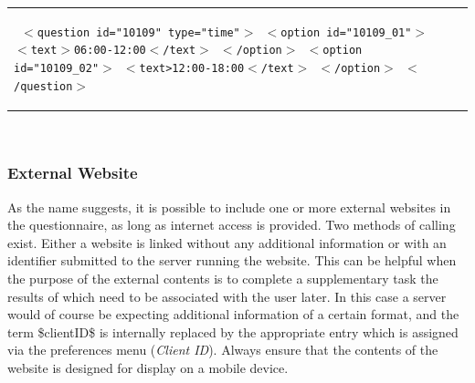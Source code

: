 \documentclass[11pt,a4paper,titlepage]{article}
\begin{document}
\begin{center}
\hspace{-0.8cm}
\begin{tabular}{p{} p{}} 
		\begin{tcolorbox}[colback=black!10!white,colframe=black!50!white, boxsep=1pt,left=4pt,right=4pt,top=4pt,bottom=2pt]
		\texttt{\noindent
			$<$question id="10109" type="time"$>$\newline
			\hspace*{0.5cm}$<$option id="10109\_01"$>$\newline
			\hspace*{1.0cm}$<$text$>$06:00-12:00$<$/text$>$\newline
			\hspace*{0.5cm}$<$/option$>$\newline
			\hspace*{0.5cm}$<$option id="10109\_02"$>$\newline
			\hspace*{1.0cm}$<$text>12:00-18:00$<$/text$>$\newline
			\hspace*{0.5cm}$<$/option$>$\newline
			$<$/question$>$
			}
		\end{tcolorbox} 
		
		&
		
	\end{tabular}\\
\end{center}


\newpage


\subsubsection{External Website}

As the name suggests, it is possible to include one or more external websites in the questionnaire, as long as internet access is provided. Two methods of calling exist. Either a website is linked without any additional information or with an identifier submitted to the server running the website. This can be helpful when the purpose of the external contents is to complete a supplementary task the results of which need to be associated with the user later. In this case a server would of course be expecting additional information of a certain format, and the term \$clientID\$ is internally replaced by the appropriate entry which is assigned via the preferences menu (\textit{Client ID}). Always ensure that the contents of the website is designed for display on a mobile device.
\end{document}
